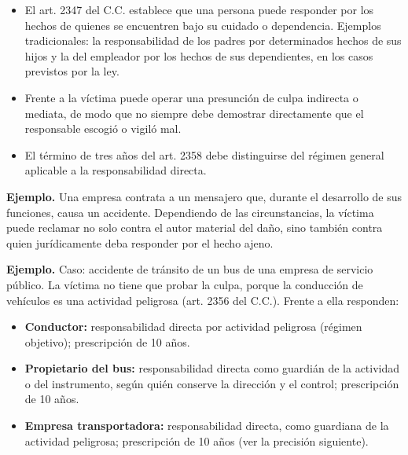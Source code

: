 \begin{itemize}
\item El art. 2347 del C.C. establece que una persona puede responder por los hechos de quienes se encuentren bajo su cuidado o dependencia. Ejemplos tradicionales: la responsabilidad de los padres por determinados hechos de sus hijos y la del empleador por los hechos de sus dependientes, en los casos previstos por la ley.
\item Frente a la víctima puede operar una presunción de culpa indirecta o mediata, de modo que no siempre debe demostrar directamente que el responsable escogió o vigiló mal.
\item El término de tres años del art. 2358 debe distinguirse del régimen general aplicable a la responsabilidad directa.
\end{itemize}
\begin{ejemplo}
\textcolor[HTML]{4F6228}{\textbf{Ejemplo. }}Una empresa contrata a un mensajero que, durante el desarrollo de sus funciones, causa un accidente. Dependiendo de las circunstancias, la víctima puede reclamar no solo contra el autor material del daño, sino también contra quien jurídicamente deba responder por el hecho ajeno.
\par
\textcolor[HTML]{4F6228}{\textbf{Ejemplo. }}Caso: accidente de tránsito de un bus de una empresa de servicio público. La víctima no tiene que probar la culpa, porque la conducción de vehículos es una actividad peligrosa (art. 2356 del C.C.). Frente a ella responden:
\end{ejemplo}
\begin{itemize}
\item \textbf{Conductor:} responsabilidad directa por actividad peligrosa (régimen objetivo); prescripción de 10 años.
\item \textbf{Propietario del bus:} responsabilidad directa como guardián de la actividad o del instrumento, según quién conserve la dirección y el control; prescripción de 10 años.
\item \textbf{Empresa transportadora:} responsabilidad directa, como guardiana de la actividad peligrosa; prescripción de 10 años (ver la precisión siguiente).
\end{itemize}
